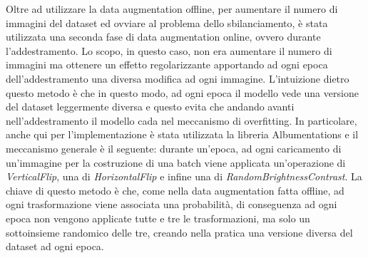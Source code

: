  Oltre ad utilizzare la data augmentation offline, per aumentare il numero di immagini del dataset ed ovviare al problema dello sbilanciamento, è stata utilizzata una seconda fase di data augmentation online, ovvero durante l'addestramento. Lo scopo, in questo caso, non era aumentare il numero di immagini ma ottenere un effetto regolarizzante apportando ad ogni epoca dell'addestramento una diversa modifica ad ogni immagine. L'intuizione dietro questo metodo è che in questo modo, ad ogni epoca il modello vede una versione del dataset leggermente diversa e questo evita che andando avanti nell'addestramento il modello cada nel meccanismo di overfitting. In particolare, anche qui per l'implementazione è stata utilizzata la libreria Albumentations e il meccanismo generale è il seguente: durante un'epoca, ad ogni caricamento di un'immagine per la costruzione di una batch viene applicata un'operazione di \textit{VerticalFlip}, una di \textit{HorizontalFlip} e infine una di \textit{RandomBrightnessContrast}. La chiave di questo metodo è che, come nella data augmentation fatta offline, ad ogni trasformazione viene associata una probabilità, di conseguenza ad ogni epoca non vengono applicate tutte e tre le trasformazioni, ma solo un sottoinsieme randomico delle tre, creando nella pratica una versione diversa del dataset ad ogni epoca.














